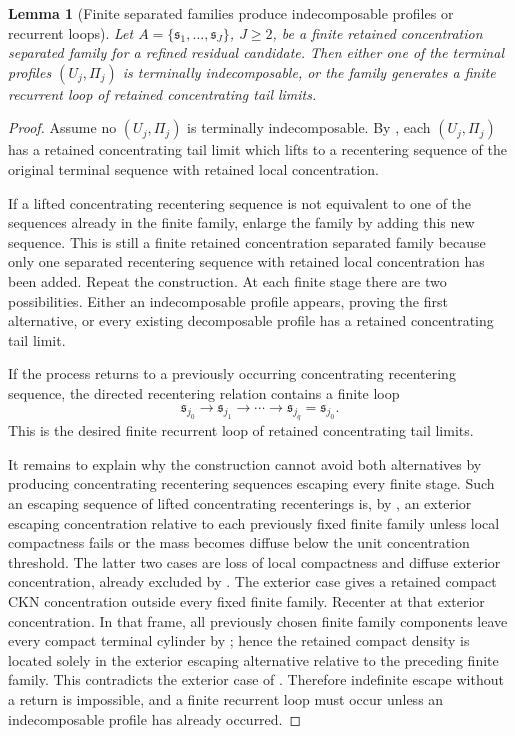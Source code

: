\documentclass[11pt]{amsart}
\numberwithin{equation}{section}
\theoremstyle{plain}
\newtheorem{lemma}[theorem]{Lemma}
\theoremstyle{definition}
\theoremstyle{remark}
\begin{document}
\begin{lemma}[Finite separated families produce indecomposable profiles or recurrent loops]
\label{lem:finite-graph-cycle}
Let \(A=\{\mathfrak s_1,\dots,\mathfrak s_J\}\), \(J\ge2\), be a finite
retained concentration separated family for a refined residual candidate.  Then either one of
the terminal profiles \((U_j,\Pi_j)\) is terminally indecomposable, or the
family generates a finite recurrent loop of retained concentrating tail limits.
\end{lemma}

\begin{proof}
Assume no \((U_j,\Pi_j)\) is terminally indecomposable.  By
, each
\((U_j,\Pi_j)\) has a retained concentrating tail limit which lifts to a
recentering sequence of the original terminal sequence with retained local
concentration.

If a lifted concentrating recentering sequence is not equivalent to one of the
sequences already in the finite family, enlarge the family by adding this new
sequence.  This is still a finite retained concentration separated family because only
one separated recentering sequence with retained local concentration has been added.  Repeat the
construction.  At each finite stage there
are two possibilities.  Either an indecomposable profile appears, proving the
first alternative, or every existing decomposable profile has a retained
concentrating tail limit.

If the process returns to a previously occurring concentrating recentering
sequence, the directed recentering relation contains a finite loop
\[
   \mathfrak s_{j_0}\to\mathfrak s_{j_1}\to\cdots
   \to\mathfrak s_{j_q}=\mathfrak s_{j_0}.
\]
This is the desired finite recurrent loop of retained concentrating tail limits.

It remains to explain why the construction cannot avoid both alternatives by
producing concentrating recentering sequences escaping every finite stage.  Such
an escaping sequence of lifted concentrating recenterings is, by
, an exterior escaping concentration
relative to each previously fixed finite family unless local compactness fails
or the mass becomes diffuse below the unit concentration threshold.  The latter
two cases are loss of local compactness and diffuse exterior concentration,
already excluded by .  The exterior case gives
a retained compact CKN concentration outside every fixed finite family.
Recenter at that exterior concentration.  In that frame, all previously chosen
finite family components leave
every compact terminal cylinder by ; hence
the retained compact density is located solely in the exterior escaping
alternative relative to the preceding finite family.  This contradicts the exterior case of
.  Therefore indefinite escape without a
return is impossible, and a finite recurrent loop must occur unless an
indecomposable profile has already occurred.
\end{proof}
\end{document}
